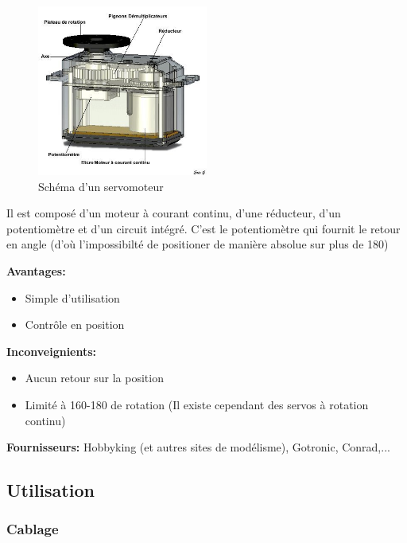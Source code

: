 \documentclass[a4paper, 11pt]{report}
\begin{document}
\begin{figure}[h!]
\begin{centering}
\includegraphics[width=0.5\textwidth]{images/schemaServo.jpg}
\caption{Schéma d'un servomoteur}
\par\end{centering}
\end{figure}

Il est composé d'un moteur à courant continu, d'une réducteur, d'un potentiomètre et d'un circuit intégré. C'est le potentiomètre qui fournit le retour en angle (d'où l'impossibilté de positioner de manière absolue sur plus de 180\degre)

\textbf{Avantages:}
\begin{itemize}
\item Simple d'utilisation
\item Contrôle en position
\end{itemize}

\textbf{Inconveignients:}
\begin{itemize}
\item Aucun retour sur la position
\item Limité à 160-180 \degre de rotation (Il existe cependant des servos à rotation continu)
\end{itemize}

\textbf{Fournisseurs:} Hobbyking (et autres sites de modélisme), Gotronic, Conrad,...

\subsection{Utilisation}

\subsubsection{Cablage}
\end{document}
